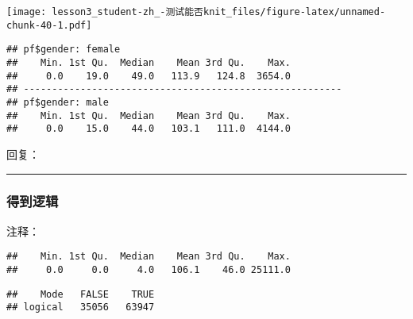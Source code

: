 \documentclass[]{article}
\newenvironment{Shaded}{\begin{snugshade}}{\end{snugshade}}
\newcommand{\DecValTok}[1]{\textcolor[rgb]{0.00,0.00,0.81}{#1}}
\newcommand{\KeywordTok}[1]{\textcolor[rgb]{0.13,0.29,0.53}{\textbf{#1}}}
\newcommand{\NormalTok}[1]{#1}
\newcommand{\OperatorTok}[1]{\textcolor[rgb]{0.81,0.36,0.00}{\textbf{#1}}}
\newcommand{\StringTok}[1]{\textcolor[rgb]{0.31,0.60,0.02}{#1}}
\begin{document}
\texttt{[image: lesson3\_student-zh\_-测试能否knit\_files/figure-latex/unnamed-chunk-40-1.pdf]}

\begin{Shaded}
\end{Shaded}

\begin{verbatim}
## pf$gender: female
##    Min. 1st Qu.  Median    Mean 3rd Qu.    Max. 
##     0.0    19.0    49.0   113.9   124.8  3654.0 
## -------------------------------------------------------- 
## pf$gender: male
##    Min. 1st Qu.  Median    Mean 3rd Qu.    Max. 
##     0.0    15.0    44.0   103.1   111.0  4144.0
\end{verbatim}

回复：

\begin{center}\rule{0.5\linewidth}{\linethickness}\end{center}

\subsubsection{得到逻辑}

注释：

\begin{Shaded}
\end{Shaded}

\begin{verbatim}
##    Min. 1st Qu.  Median    Mean 3rd Qu.    Max. 
##     0.0     0.0     4.0   106.1    46.0 25111.0
\end{verbatim}

\begin{Shaded}
\end{Shaded}

\begin{verbatim}
##    Mode   FALSE    TRUE 
## logical   35056   63947
\end{verbatim}
\end{document}
